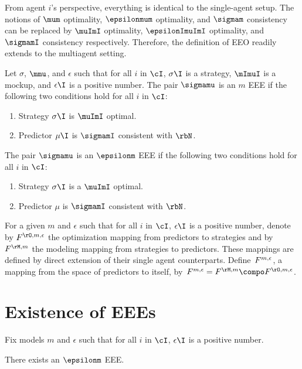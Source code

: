 From agent \(i\)'s perspective, everything is identical to the single-agent setup.
The notions of \(\mum\) optimality, \(\epsilonmum\) optimality, and \(\sigmam\) consistency can be replaced by \(\muImI\) optimality, \(\epsilonImuImI\) optimality, and \(\sigmamI\) consistency respectively.
Therefore, the definition of EEO readily extends to the multiagent setting.
\begin{definition}
Let \(\sigma\), \(\mmu\), and \(\epsilon\) such that for all \(i\) in \(\cI\), \(\sigma\I\) is a strategy, \(\mImuI\) is a mockup, and \(\epsilon\I\) is a positive number.
The pair \(\sigmamu\) is an \(m\) EEE if the following two conditions hold for all \(i\) in \(\cI\):
\begin{enumerate}
\item Strategy \(\sigma\I\) is \(\muImI\) optimal.
\item Predictor \(\mu\I\) is \(\sigmamI\) consistent with \(\rbN\).
\end{enumerate}
The pair \(\sigmamu\) is an \(\epsilonm\) EEE if the following two conditions hold for all \(i\) in \(\cI\):
\begin{enumerate}
\item Strategy \(\sigma\I\) is a \(\muImI\) optimal.
\item Predictor \(\mu\) is \(\sigmamI\) consistent with \(\rbN\).
\end{enumerate}
\end{definition}

For a given \(m\) and \(\epsilon\) such that for all \(i\) in \(\cI\), \(\epsilon\I\) is a positive number, denote by \(\FO\) the optimization mapping from predictors to strategies and by \(\FM\) the modeling mapping from strategies to  predictors.
These mappings are defined by direct extension of their single agent counterparts.
Define~\(F^{m, \epsilon}\), a mapping from the space of predictors to itself, by~\(\FF = \FM \compo \FO\).


\section{Existence of EEEs}
\label{sec:existence_of_eees}


Fix models \(m\) and \(\epsilon\) such that for all \(i\) in \(\cI\), \(\epsilon\I\) is a positive number.

\begin{theorem}
\label{res:mme_existence}
There exists an \(\epsilonm\) EEE.
\end{theorem}

